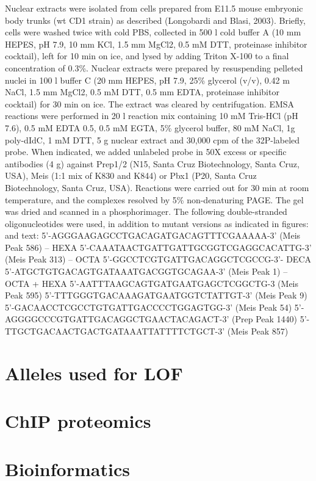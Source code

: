 Nuclear extracts were isolated from cells prepared from E11.5 mouse embryonic body trunks (wt CD1 strain) as described (Longobardi and Blasi, 2003). Briefly, cells were washed twice with cold PBS, collected in 500 \textmu l cold buffer A (10 mm HEPES, pH 7.9, 10 mm KCl, 1.5 mm MgCl2, 0.5 mM DTT, proteinase inhibitor cocktail), left for 10 min on ice, and lysed by adding Triton X-100 to a final concentration of 0.3\%. Nuclear extracts were prepared by resuspending pelleted nuclei in 100 \textmu l buffer C (20 mm HEPES, pH 7.9, 25\% glycerol (v/v), 0.42 m NaCl, 1.5 mm MgCl2, 0.5 mM DTT, 0.5 mm EDTA, proteinase inhibitor cocktail) for 30 min on ice. The extract was cleared by centrifugation.
EMSA reactions were performed in 20 \textmu l reaction mix containing 10 mM Tris-HCl (pH 7.6), 0.5 mM EDTA 0.5, 0.5 mM EGTA, 5\% glycerol buffer, 80 mM NaCl, 1\textmu g poly-dIdC, 1 mM DTT, 5 \textmu g nuclear extract and 30,000 cpm of the 32P-labeled probe. When indicated, we added unlabeled probe in 50X excess or specific antibodies (4 \textmu g) against Prep1/2 (N15, Santa Cruz Biotechnology, Santa Cruz, USA), Meis (1:1 mix of K830 and K844) or Pbx1 (P20, Santa Cruz Biotechnology, Santa Cruz, USA). Reactions were carried out for 30 min at room temperature, and the complexes resolved by 5\% non-denaturing PAGE. The gel was dried and scanned in a phosphorimager. 
The following double-stranded oligonucleotides were used, in addition to mutant versions as indicated in figures: and text:
5’-AGGGAAGAGCCTGACAGATGACAGTTTCGAAAAA-3’ (Meis Peak 586) -- HEXA
5’-CAAATAACTGATTGATTGCGGTCGAGGCACATTG-3’ (Meis Peak 313) – OCTA
5’-GGCCTCGTGATTGACAGGCTCGCCG-3’- DECA
5’-ATGCTGTGACAGTGATAAATGACGGTGCAGAA-3’ (Meis  Peak 1) -- OCTA + HEXA
5’-AATTTAAGCAGTGATGAATGAGCTCGGCTG-3 (Meis Peak 595)
5’-TTTGGGTGACAAAGATGAATGGTCTATTGT-3’ (Meis Peak 9)
5’-GACAACCTCGCCTGTGATTGACCCCTGGAGTGG-3’ (Meis Peak 54)
5’-AGGGGCCCGTGATTGACAGGCTGAACTACAGACT-3’ (Prep Peak 1440)
5’-TTGCTGACAACTGACTGATAAATTATTTTCTGCT-3’ (Meis Peak 857)

\section{Alleles used for LOF}

\section{ChIP proteomics}

\section{Bioinformatics}

